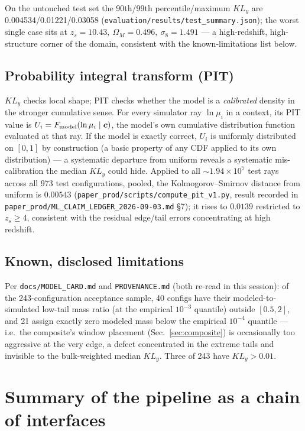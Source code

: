 \documentclass[11pt]{article}
\newcommand{\file}[1]{\texttt{#1}}
\newcommand{\vect}[1]{\boldsymbol{#1}}
\begin{document}
On the untouched test set the 90th/99th percentile/maximum $KL_y$ are
0.004534/0.01221/0.03058 (\file{evaluation/results/test\_summary.json}); the
worst single case sits at $z_s=10.43,\ \Omega_M=0.496,\ \sigma_8=1.491$ — a
high-redshift, high-structure corner of the domain, consistent with the
known-limitations list below.

\subsection{Probability integral transform (PIT)}

$KL_y$ checks local shape; PIT checks whether the model is a
\emph{calibrated} density in the stronger cumulative sense. For every
simulator ray $\ln\mu_i$ in a context, its PIT value is
$U_i = F_{\rm model}(\ln\mu_i\mid\vect c)$, the model's own cumulative
distribution function evaluated at that ray. If the model is exactly
correct, $U_i$ is uniformly distributed on $[0,1]$ by construction (a basic
property of any CDF applied to its own distribution) — a systematic
departure from uniform reveals a systematic mis-calibration the median
$KL_y$ could hide. Applied to all $\sim1.94\times10^7$ test rays across all
973 test configurations, pooled, the Kolmogorov–Smirnov distance from
uniform is $0.00543$ (\file{paper\_prod/scripts/compute\_pit\_v1.py},
result recorded in \file{paper\_prod/ML\_CLAIM\_LEDGER\_2026-09-03.md}
§7); it rises to $0.0139$ restricted to $z_s\ge4$, consistent with the
residual edge/tail errors concentrating at high redshift.

\subsection{Known, disclosed limitations}

Per \file{docs/MODEL\_CARD.md} and \file{PROVENANCE.md} (both re-read in
this session): of the 243-configuration acceptance sample, 40 configs have
their modeled-to-simulated low-tail mass ratio (at the empirical
$10^{-3}$ quantile) outside $[0.5,2]$, and 21 assign exactly zero modeled
mass below the empirical $10^{-4}$ quantile — i.e.\ the composite's window
placement (Sec.~\ref{sec:composite}) is occasionally too aggressive at the
very edge, a defect concentrated in the extreme tails and invisible to the
bulk-weighted median $KL_y$. Three of 243 have $KL_y>0.01$.

\section{Summary of the pipeline as a chain of interfaces}
\end{document}

